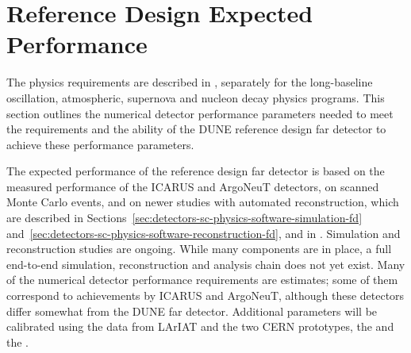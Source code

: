 
\section{Reference Design Expected Performance}
\label{sec:detectors-fd-ref-perf}

The physics requirements are described in \volphys,
separately for the long-baseline oscillation, atmospheric, supernova
and nucleon decay physics programs.  This section outlines the
numerical detector performance parameters needed to meet the
requirements and the ability of the DUNE reference
design far detector to achieve these performance parameters.  

The expected performance of the reference design far detector is based
on the measured performance of the ICARUS\cite{Amerio:2004ze} and
ArgoNeuT\cite{Anderson:2012vc} detectors, on scanned Monte Carlo
events\cite{docdb-6954}, and on newer studies with automated
reconstruction, which are described in
Sections~\ref{sec:detectors-sc-physics-software-simulation-fd}
and~\ref{sec:detectors-sc-physics-software-reconstruction-fd}, and in
\anxreco.  Simulation and reconstruction studies are ongoing.  While
many components are in place, a full end-to-end simulation,
reconstruction and analysis chain does not yet exist. Many of the
numerical detector performance requirements are estimates; some of
them correspond to achievements by ICARUS and ArgoNeuT, although these
detectors differ somewhat from the DUNE far detector.  Additional
parameters will be calibrated using the data from LArIAT and the two
CERN prototypes, the \cernsingleproto{} and the \cerndualproto.

